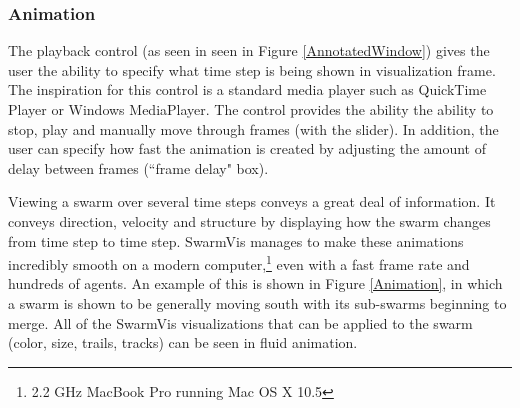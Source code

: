 \documentclass[conference]{IEEEtran}
\begin{document}
\subsubsection{Animation}

The playback control (as seen in  seen in Figure \ref{AnnotatedWindow})
gives the user the ability to specify what time step is being shown in visualization frame.
The inspiration for this control is a standard media player such as QuickTime Player or Windows MediaPlayer.
The control provides the ability the ability to stop,
play and manually move through frames (with the slider).
In addition, the user can specify how fast the animation is created by adjusting the amount of delay between
frames (``frame delay" box).

Viewing a swarm over several time steps conveys a great deal of information. It conveys direction,
velocity and structure by displaying how the swarm changes from time step to time step.
SwarmVis manages to make these animations incredibly smooth on a modern
computer,\footnote{2.2 GHz MacBook Pro running Mac OS X 10.5} even with a fast frame rate and hundreds of agents.
An example of this is shown in Figure \ref{Animation}, in which a swarm is shown to be
generally moving south with its sub-swarms beginning to merge.
All of the SwarmVis visualizations  that can be applied to the swarm (color, size, trails, tracks) can be seen in fluid animation.
\end{document}
